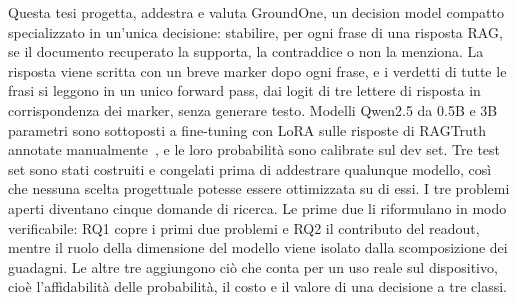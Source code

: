 Questa tesi progetta, addestra e valuta GroundOne, un decision model compatto specializzato in un'unica decisione: stabilire,
per ogni frase di una risposta RAG, se il documento recuperato la supporta, la contraddice o non la menziona. La risposta
viene scritta con un breve marker dopo ogni frase, e i verdetti di tutte le frasi si leggono in un unico forward pass, dai
logit di tre lettere di risposta in corrispondenza dei marker, senza generare testo. Modelli Qwen2.5 da 0.5B e 3B
parametri sono sottoposti a fine-tuning con LoRA sulle risposte di RAGTruth annotate
manualmente~\cite{qwen2024qwen25,hu2022lora,niu2024ragtruth}, e le loro probabilità sono calibrate sul dev set. Tre test
set sono stati costruiti e congelati prima di addestrare qualunque modello, così che nessuna scelta progettuale potesse
essere ottimizzata su di essi. I tre problemi aperti diventano cinque domande di ricerca. Le prime due li riformulano in modo verificabile: RQ1 copre i primi due problemi e RQ2 il contributo del readout, mentre il ruolo della dimensione del modello viene isolato dalla scomposizione dei guadagni. Le altre tre aggiungono ciò che conta per un uso reale sul dispositivo, cioè l'affidabilità delle
probabilità, il costo e il valore di una decisione a tre classi.

